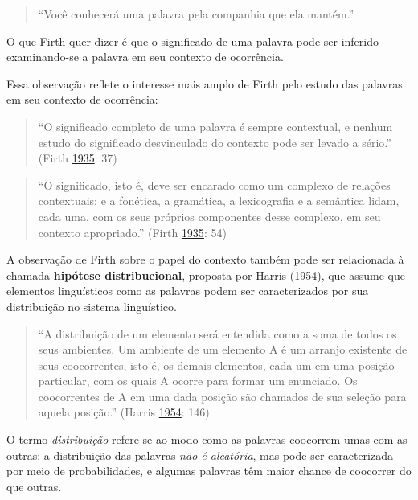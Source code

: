 \documentclass[
  brazilian,
]{article}
\begin{document}
\begin{quote}
``Você conhecerá uma palavra pela companhia que ela mantém.''
\end{quote}

O que Firth quer dizer é que o significado de uma palavra pode ser
inferido examinando-se a palavra em seu contexto de ocorrência.

Essa observação reflete o interesse mais amplo de Firth pelo estudo das
palavras em seu contexto de ocorrência:

\begin{quote}
``O significado completo de uma palavra é sempre contextual, e nenhum
estudo do significado desvinculado do contexto pode ser levado a
sério.'' (Firth
\href{https://doi.org/10.1111/j.1467-968X.1935.tb01254.x}{1935}: 37)
\end{quote}

\begin{quote}
``O significado, isto é, deve ser encarado como um complexo de relações
contextuais; e a fonética, a gramática, a lexicografia e a semântica
lidam, cada uma, com os seus próprios componentes desse complexo, em seu
contexto apropriado.'' (Firth
\href{https://doi.org/10.1111/j.1467-968X.1935.tb01254.x}{1935}: 54)
\end{quote}

A observação de Firth sobre o papel do contexto também pode ser
relacionada à chamada \textbf{hipótese distribucional}, proposta por
Harris (\href{https://doi.org/10.1080/00437956.1954.11659520}{1954}),
que assume que elementos linguísticos como as palavras podem ser
caracterizados por sua distribuição no sistema linguístico.

\begin{quote}
``A distribuição de um elemento será entendida como a soma de todos os
seus ambientes. Um ambiente de um elemento A é um arranjo existente de
seus coocorrentes, isto é, os demais elementos, cada um em uma posição
particular, com os quais A ocorre para formar um enunciado. Os
coocorrentes de A em uma dada posição são chamados de sua seleção para
aquela posição.'' (Harris
\href{https://doi.org/10.1080/00437956.1954.11659520}{1954}: 146)
\end{quote}

O termo \emph{distribuição} refere-se ao modo como as palavras coocorrem
umas com as outras: a distribuição das palavras \emph{não é aleatória},
mas pode ser caracterizada por meio de probabilidades, e algumas
palavras têm maior chance de coocorrer do que outras.
\end{document}
